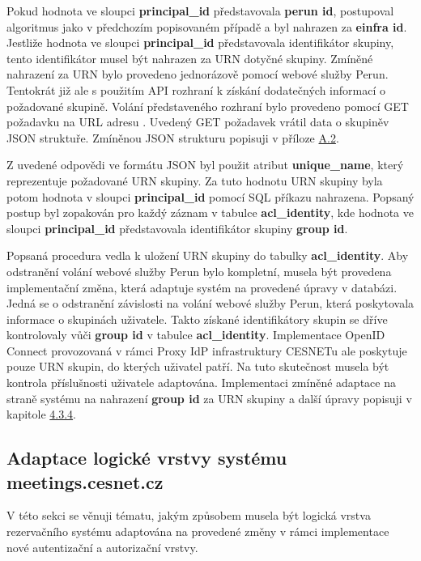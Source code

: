 \documentclass[
  printed, %
  twoside, %
  table,   %
  nolof,     %
  nolot,     %
]{fithesis3}
\begin{document}
\par 
Pokud hodnota ve sloupci \textbf{principal\_id} představovala \textbf{perun id}, postupoval algoritmus jako v předchozím popisovaném případě a byl nahrazen za \textbf{einfra id}. Jestliže hodnota ve sloupci \textbf{principal\_id} představovala identifikátor skupiny, tento identifikátor musel být nahrazen za URN  dotyčné skupiny. Zmíněné nahrazení za URN bylo provedeno jednorázově pomocí webové služby Perun. Tentokrát již ale s použitím API rozhraní k získání dodatečných informací o požadované skupině. Volání představeného rozhraní bylo provedeno pomocí GET požadavku na URL adresu  . Uvedený GET požadavek vrátil data o skupině\break v JSON struktuře. Zmíněnou JSON strukturu popisuji v příloze \hyperref[table:perunws:group]{A.2}.
\par
Z uvedené odpovědi ve formátu JSON byl použit atribut \linebreak\textbf{unique\_name}, který reprezentuje požadované URN skupiny. Za tuto hodnotu URN skupiny byla potom hodnota v sloupci \textbf{principal\_id} pomocí SQL příkazu nahrazena. Popsaný postup byl zopakován pro každý záznam v tabulce \textbf{acl\_identity}, kde hodnota ve sloupci \textbf{principal\_id} představovala identifikátor skupiny \textbf{group id}. 
\par 

Popsaná procedura vedla k uložení URN skupiny do tabulky \textbf{acl\_identity}. Aby odstranění volání webové služby Perun bylo kompletní, musela být provedena implementační změna, která adaptuje systém  na provedené úpravy v databázi. Jedná se o odstranění závislosti na volání webové služby Perun, která poskytovala informace o skupinách uživatele. Takto získané identifikátory skupin se dříve kontrolovaly vůči \textbf{group id} v tabulce \textbf{acl\_identity}. Implementace OpenID Connect provozovaná v rámci Proxy IdP infrastruktury CESNETu ale poskytuje pouze URN skupin, do kterých uživatel patří. Na tuto skutečnost musela být kontrola příslušnosti uživatele adaptována. Implementaci zmíněné adaptace na straně systému  na nahrazení \textbf{group id} za URN skupiny a další úpravy popisuji v kapitole \hyperref[ShongoImpl-web]{4.3.4}. 

\subsection[Adaptace logické vrstvy systému\break meetings.cesnet.cz]{Adaptace logické vrstvy systému meetings.cesnet.cz}
\label{ShongoImpl-web}
V této sekci se věnuji tématu, jakým způsobem musela být logická vrstva rezervačního systému  adaptována na provedené změny v rámci implementace nové autentizační a autorizační vrstvy. 
\par
\end{document}
